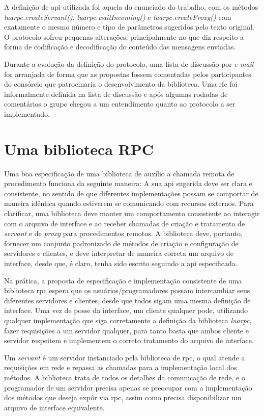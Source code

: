 \documentclass[11pt]{article}
\begin{document}
A definição de \gls{api} utilizada foi aquela do enunciado do trabalho, com os
métodos \textit{luarpc.createServant()}, \textit{luarpc.waitIncoming()} e
\textit{luarpc.createProxy()} com exatamente o mesmo número e tipo de
parâmetros sugeridos pelo texto original. O protocolo sofreu pequenas
alterações, principalmente no que diz respeito a forma de codificação e
decodificação do conteúdo das mensagens enviadas.

Durante a evolução da definição do protocolo, uma lista de discussão por
\textit{e-mail} for arranjada de forma que as propostas fossem comentadas pelos
participantes do consórcio que patrocinaria o desenvolvimento da biblioteca.
Uma \gls{rfc} foi informalmente definida na lista de discussão e após algumas
rodadas de comentários o grupo chegou a um entendimento quanto ao protocolo a
ser implementado.

\section{Uma biblioteca RPC}\label{sec:rpc}

Uma boa especificação de uma biblioteca de auxílio a chamada remota de
procedimento funciona da seguinte maneira: A sua \gls{api} sugerida deve ser
clara e consistente, no sentido de que diferentes implementações possam se
comportar de maneira idêntica quando estiverem se comunicando com recursos
externos. Para clarificar, uma biblioteca deve manter um comportamento
consistente ao interagir com o arquivo de interface e ao receber chamadas de
criação e tratamento de \textit{servant} e de \textit{proxy} para procedimentos
remotos. A biblioteca deve, portanto, fornecer um conjunto padronizado de
métodos de criação e configuração de servidores e clientes, e deve interpretar
de maneira correta um arquivo de interface, desde que, é claro, tenha sido
escrito seguindo a \gls{api} especificada.

Na prática, a proposta de especificação e implementação consistente de uma
biblioteca \gls{rpc} espera que os usuários/programadores possam intercambiar
seus diferentes servidores e clientes, desde que todos sigam uma mesma
definição de interface. Uma vez de posse da interface, um cliente qualquer
pode, utilizando qualquer implementação que siga corretamente a definição da
biblioteca \textit{luarpc}, fazer requisições a um servidor qualquer, para
tanto basta que ambos cliente e servidor respeitem e implementem o correto
tratamento do arquivo de interface.

Um \textit{servant} é um servidor instanciado pela biblioteca de \gls{rpc}, o
qual atende a requisições em rede e repassa as chamadas para a implementação
local dos métodos. A biblioteca trata de todos os detalhes da comunicação de
rede, e o programador de um servidor precisa apenas se preocupar com a
implementação dos métodos que deseja expôr via \gls{rpc}, assim como precisa
disponibilizar um arquivo de interface equivalente.
\end{document}
